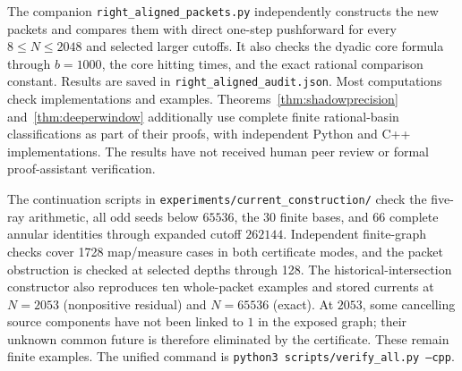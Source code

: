 \documentclass[11pt]{article}
\begin{document}
The companion \texttt{right\_aligned\_packets.py} independently constructs the
new packets and compares them with direct one-step pushforward for every
$8\le N\le2048$ and selected larger cutoffs. It also checks the dyadic core
formula through $b=1000$, the core hitting times, and the exact rational
comparison constant. Results are saved in \texttt{right\_aligned\_audit.json}.
Most computations check implementations and examples.
Theorems~\ref{thm:shadowprecision} and~\ref{thm:deeperwindow}
additionally use complete finite rational-basin classifications as part
of their proofs, with independent Python and C++ implementations.
The results have not received human peer
review or formal proof-assistant verification.

The continuation scripts in
\texttt{experiments/current\_construction/} check the five-ray arithmetic,
all odd seeds below $65536$, the 30 finite bases, and 66 complete annular
identities through expanded cutoff $262144$. Independent finite-graph
checks cover 1728 map/measure cases in both certificate modes, and the
packet obstruction is checked at selected depths through 128.
The historical-intersection constructor also reproduces ten whole-packet
examples and stored currents at $N=2053$ (nonpositive residual) and
$N=65536$ (exact). At $2053$, some cancelling source components have not
been linked to $1$ in the exposed graph; their unknown common future is
therefore eliminated by the certificate. These remain finite examples.
The unified command is \texttt{python3 scripts/verify\_all.py --cpp}.
\end{document}
